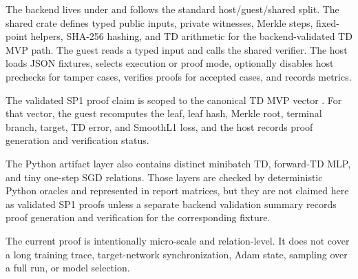 The backend lives under  and follows the standard
host/guest/shared split. The shared crate defines typed public inputs, private
witnesses, Merkle steps, fixed-point helpers, SHA-256 hashing, and TD
arithmetic for the backend-validated TD MVP path. The guest reads a typed input
and calls the shared verifier. The host loads JSON fixtures, selects execution
or proof mode, optionally disables host prechecks for tamper cases, verifies
proofs for accepted cases, and records metrics.

The validated SP1 proof claim is scoped to the canonical TD MVP vector
. For that vector, the guest
recomputes the leaf, leaf hash, Merkle root, terminal branch, target, TD error,
and SmoothL1 loss, and the host records proof generation and verification
status.

The Python artifact layer also contains distinct minibatch TD, forward-TD MLP,
and tiny one-step SGD relations. Those layers are checked by deterministic
Python oracles and represented in report matrices, but they are not claimed
here as validated SP1 proofs unless a separate backend validation summary
records proof generation and verification for the corresponding fixture.

The current proof is intentionally micro-scale and relation-level. It does not
cover a long training trace, target-network synchronization, Adam state,
sampling over a full run, or model selection.

